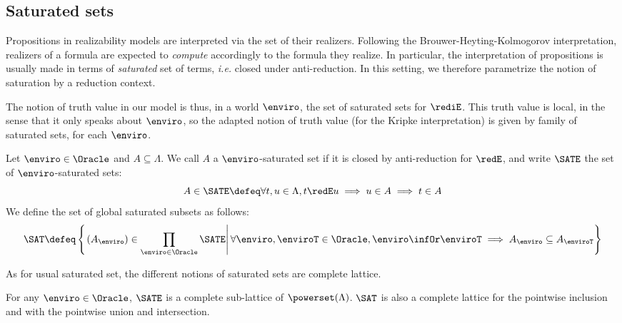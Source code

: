 \subsection{Saturated sets}
Propositions in realizability models are interpreted via the set of their realizers. Following the Brouwer-Heyting-Kolmogorov interpretation, realizers of a formula are expected to \emph{compute} accordingly to the formula they realize. In particular, the interpretation of propositions is usually made in terms of \emph{saturated} set of terms, \emph{i.e.} closed under anti-reduction.
%
In this setting, we therefore parametrize the notion of saturation by a reduction context.

The notion of truth value in our model is thus, in a world $\enviro$, the set of saturated sets for $\rediE$. This truth value is local, in the sense that it only speaks about $\enviro$, so the adapted notion of truth value (for the Kripke interpretation) is given by family of saturated sets, for each $\enviro$.

\begin{definition}
  Let $\enviro\in\Oracle$ and $A \subseteq \Lambda$.
  We call $A$ a $\enviro$-saturated set if it is closed by anti-reduction for $\redE$, and write $\SATE$ the set of $\enviro$-saturated sets:
  \[A \in \SATE \defeq \forall t,u \in \Lambda, t \redE u \implies u \in A \implies t \in A\]
  We define the set of global saturated subsets as follows:
  \[\SAT \defeq \left\{\left.(A_{\enviro}) \in \prod_{\enviro\in\Oracle} \SATE \right\vert
  \forall \enviro,\enviroT\in\Oracle, \enviro \infOr \enviroT \implies A_{\enviro} \subseteq A_{\enviroT}\right\}\]
\end{definition}

As for usual saturated set, the different notions of saturated sets are complete lattice.

\begin{proposition}
  For any $\enviro \in \Oracle$, $\SATE$ is a complete sub-lattice of $\powerset(\Lambda)$. $\SAT$ is also a complete lattice for the pointwise inclusion and with the pointwise union and intersection.
\end{proposition}

